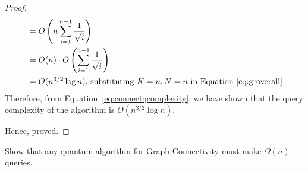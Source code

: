 \begin{solution}[label=ques:4b]
\begin{proof}[Proof]
\begin{equation}
\begin{split}
        &= O\left(n\sum_{i=1}^{n-1}\frac{1}{\sqrt{i}}\right)\\
        &= O(n)\cdot O\left(\sum_{i=1}^{n-1}\frac{1}{\sqrt{i}}\right)\\
        &= O(n^{3/2}\log{n})\text{, substituting }K = n, N = n\text{ in Equation~\ref{eq:groverall}}
      \end{split}
      \label{eq:connectqcomplexity}
    \end{equation}
    Therefore, from Equation~\ref{eq:connectqcomplexity}, we have shown that the query complexity of the algorithm is $O(n^{3/2}\log{n})$.\par
    Hence, proved.
  \end{proof}
\end{solution}

\begin{solution}[label=ques:4c]
  \begin{question}
    Show that any quantum algorithm for Graph Connectivity must make $\Omega(n)$ queries. 


\end{question}
\end{solution}
